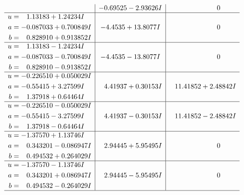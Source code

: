 \documentclass[1p]{elsarticle_modified}
\theoremstyle{definition}
\begin{document}
$$\begin{array}{c|c|c}
 & -0.69525 - 2.93626 I & \phantom{-0.000000 } 0 \\ \hline\begin{aligned}
u &= \phantom{-}1.13183 + 1.24234 I \\
a &= -0.087033 + 0.700849 I \\
b &= \phantom{-}0.828910 + 0.913852 I\end{aligned}
 & -4.4535 + 13.8077 I & \phantom{-0.000000 } 0 \\ \hline\begin{aligned}
u &= \phantom{-}1.13183 - 1.24234 I \\
a &= -0.087033 - 0.700849 I \\
b &= \phantom{-}0.828910 - 0.913852 I\end{aligned}
 & -4.4535 - 13.8077 I & \phantom{-0.000000 } 0 \\ \hline\begin{aligned}
u &= -0.226510 + 0.050029 I \\
a &= -0.55415 + 3.27599 I \\
b &= \phantom{-}1.37918 + 0.64464 I\end{aligned}
 & \phantom{-}4.41937 + 0.30153 I & \phantom{-}11.41852 + 2.48842 I \\ \hline\begin{aligned}
u &= -0.226510 - 0.050029 I \\
a &= -0.55415 - 3.27599 I \\
b &= \phantom{-}1.37918 - 0.64464 I\end{aligned}
 & \phantom{-}4.41937 - 0.30153 I & \phantom{-}11.41852 - 2.48842 I \\ \hline\begin{aligned}
u &= -1.37570 + 1.13746 I \\
a &= \phantom{-}0.343201 - 0.086947 I \\
b &= \phantom{-}0.494532 + 0.264029 I\end{aligned}
 & \phantom{-}2.94445 + 5.95495 I & \phantom{-0.000000 } 0 \\ \hline\begin{aligned}
u &= -1.37570 - 1.13746 I \\
a &= \phantom{-}0.343201 + 0.086947 I \\
b &= \phantom{-}0.494532 - 0.264029 I\end{aligned}
 & \phantom{-}2.94445 - 5.95495 I & \phantom{-0.000000 } 0\\
 \hline 
 \end{array}$$\newpage$$\begin{array}{c|c|c}  

\end{array}$$
\end{document}
